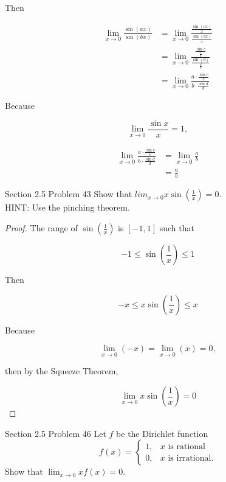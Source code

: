\documentclass{article}
\begin{document}
    Then

    \begin{align*}
        \lim_{x\to 0} \frac{\sin{(ax)}}{\sin{(bx)}} &= \lim_{x\to 0} \frac{\frac{\sin{(ax)}}{x}}{\frac{\sin{(bx)}}{x}} \\
                                                    &= \lim_{x\to 0} \frac{\frac{\sin{c}}{\frac{c}{a}}}{\frac{\sin{(d)}}{\frac{d}{b}}} \\
                                                    &= \lim_{x\to 0} \frac{a\cdot \frac{\sin{c}}{c}}{b\cdot \frac{\sin{d}}{d}}
    \end{align*}

    Because

    \[
        \lim_{x\to 0} \frac{\sin{x}}{x} = 1,
    \]

    \begin{align*}
        \lim_{x\to 0} \frac{a\cdot \frac{\sin{c}}{c}}{b\cdot \frac{\sin{d}}{d}} &= \lim_{x\to 0} \frac{a}{b} \\
                                                                                &= \frac{a}{b}
    \end{align*}

    \begin{tbhtheorem}{Section 2.5 Problem 43}
        Show that $lim_{x\to 0} x \sin{\left(\frac{1}{x}\right)}=0$. \\
        HINT: Use the pinching theorem.
    \end{tbhtheorem}

    \begin{proof}
        The range of $\sin{(\frac{1}{x})}$ is $[-1,1]$ such that

        \[
            -1 \leq \sin{\left(\frac{1}{x}\right)} \leq 1
        \]

        Then

        \[
            -x \leq x \sin{\left(\frac{1}{x}\right)} \leq x
        \]

        Because

        \[
            \lim_{x\to 0} (-x) = \lim_{x\to 0} (x) = 0,
        \]

        then by the Squeeze Theorem,

        \[
            \lim_{x\to 0} x\sin{\left(\frac{1}{x}\right)} = 0
        \]
    \end{proof}

    \pagebreak
    \thispagestyle{page6}

    \begin{tbhtheorem}{Section 2.5 Problem 46}
        Let $f$ be the Dirichlet function
        \[
            f(x) =
            \begin{cases}
                1,  & x \text{ is rational} \\
                0,  & x \text{ is irrational.}
            \end{cases}
        \]
        Show that $\lim_{x\to 0} x f(x) = 0$.
    \end{tbhtheorem}
\end{document}
